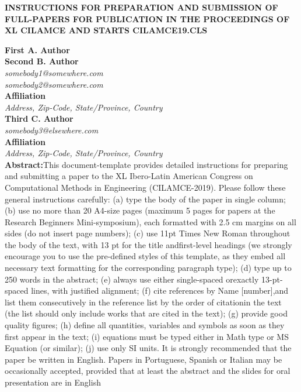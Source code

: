 \documentclass{cilamce19}
\begin{document}
 \vspace{200cm}	
 \hspace{150cm}
 \begin{center}
 	\begin{title}
 		\centering
 		\textbf{INSTRUCTIONS FOR PREPARATION AND SUBMISSION OF FULL-PAPERS FOR PUBLICATION IN THE PROCEEDINGS OF XL CILAMCE AND STARTS CILAMCE19.CLS}
 	\end{title}	
 \end{center}



\textbf{First A. Author}
\\
\textbf{Second B. Author}
\\
\textit{somebody1@somewhere.com}\\
\textit{somebody2@somewhere.com}
\\
\textbf{Affiliation}
\\
\textit{Address, Zip-Code, State/Province, Country}
\\
\textbf{Third C. Author}
\\
\textit{somebody3@elsewhere.com}\\
\textbf{Affiliation}
\\
\textit{Address, Zip-Code, State/Province, Country}
\\

\textbf{Abstract:}This document-template provides detailed instructions for preparing and submitting a paper to the XL Ibero-Latin American Congress on Computational Methods in Engineering (CILAMCE-2019). Please follow these general instructions carefully: (a) type the body of the paper in single column; (b) use no more than 20 A4-size pages (maximum 5 pages for papers at the Research Beginners Mini-symposium), each formatted with 2.5 cm margins on all sides (do not insert page numbers); (c) use 11pt Times New Roman throughout the body of the text, with 13 pt for the title andfirst-level headings (we strongly encourage you to use the pre-defined styles of this template, as they embed all necessary text formatting for the corresponding paragraph type); (d) type up to 250 words in the abstract; (e) always use either single-spaced orexactly 13-pt-spaced lines, with justified alignment; (f) cite references by Name [number],and list them consecutively in the reference list by the order of citationin the text (the list should only include works that are cited in the text); (g) provide good quality figures; (h) define all quantities, variables and symbols as soon as they first appear in the text; (i) equations must be typed either in Math type or MS Equation (or similar); (j) use only SI units. It is strongly recommended that the paper be written in English. Papers in Portuguese, Spanish or Italian may be occasionally accepted, provided that at least the abstract and the slides for oral presentation are in English
\end{document}
